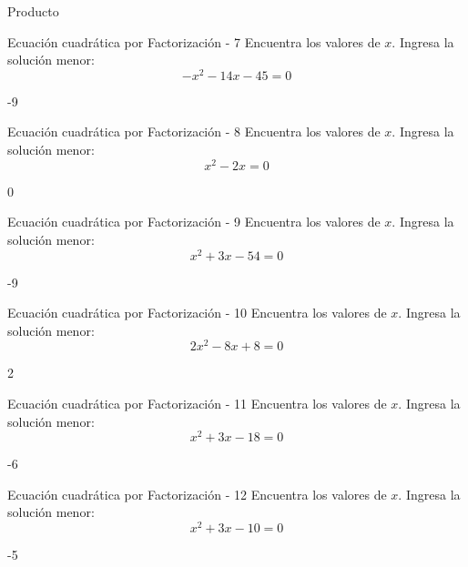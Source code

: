 \documentclass[a4,11pt]{aleph-notas}
\begin{document}
\begin{quiz}{Producto}
\begin{numerical}[]%
    {Ecuación cuadrática por Factorización - 7}
    Encuentra los valores de $x$. Ingresa la solución menor:
    \[
        - x^{2} - 14 x - 45 = 0
    \]
    \item[] -9
\end{numerical}

\begin{numerical}[]%
    {Ecuación cuadrática por Factorización - 8}
    Encuentra los valores de $x$. Ingresa la solución menor:
    \[
        x^{2} - 2 x = 0
    \]
    \item[] 0
\end{numerical}

\begin{numerical}[]%
    {Ecuación cuadrática por Factorización - 9}
    Encuentra los valores de $x$. Ingresa la solución menor:
    \[
        x^{2} + 3 x - 54 = 0
    \]
    \item[] -9
\end{numerical}

\begin{numerical}[]%
    {Ecuación cuadrática por Factorización - 10}
    Encuentra los valores de $x$. Ingresa la solución menor:
    \[
        2 x^{2} - 8 x + 8 = 0
    \]
    \item[] 2
\end{numerical}

\begin{numerical}[]%
    {Ecuación cuadrática por Factorización - 11}
    Encuentra los valores de $x$. Ingresa la solución menor:
    \[
        x^{2} + 3 x - 18 = 0
    \]
    \item[] -6
\end{numerical}

\begin{numerical}[]%
    {Ecuación cuadrática por Factorización - 12}
    Encuentra los valores de $x$. Ingresa la solución menor:
    \[
        x^{2} + 3 x - 10 = 0
    \]
    \item[] -5
\end{numerical}


\end{quiz}
\end{document}
